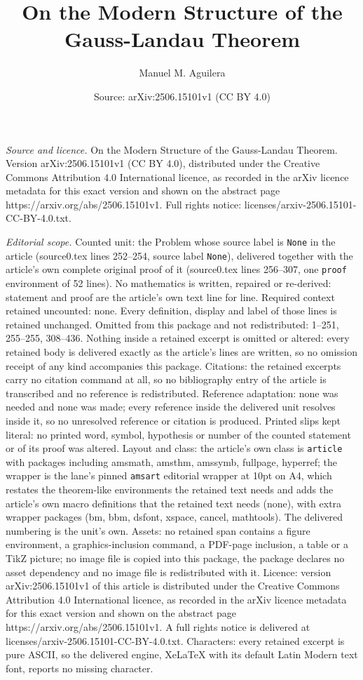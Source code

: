 \documentclass[10pt,a4paper]{amsart}
\title[On the Modern Structure of the Gauss-Landau Theorem]{On the Modern Structure of the Gauss-Landau Theorem}
\author{Manuel M. Aguilera}
\date{Source: arXiv:2506.15101v1 (CC BY 4.0)}
\begin{document}
\maketitle

\noindent\emph{Source and licence.} On the Modern Structure of the Gauss-Landau Theorem. Version arXiv:2506.15101v1 (CC BY 4.0), distributed under the Creative Commons Attribution 4.0 International licence, as recorded in the arXiv licence metadata for this exact version and shown on the abstract page https://arxiv.org/abs/2506.15101v1. Full rights notice: licenses/arxiv-2506.15101-CC-BY-4.0.txt.\par\smallskip

\noindent\textit{Editorial scope.} Counted unit: the Problem whose source label is \texttt{None} in the article (source0.tex lines 252--254, source label \texttt{None}), delivered together with the article's own complete original proof of it (source0.tex lines 256--307, one \texttt{proof} environment of 52 lines). No mathematics is written, repaired or re-derived: statement and proof are the article's own text line for line. Required context retained uncounted: none. Every definition, display and label of those lines is retained unchanged. Omitted from this package and not redistributed: 1--251, 255--255, 308--436. Nothing inside a retained excerpt is omitted or altered: every retained body is delivered exactly as the article's lines are written, so no omission receipt of any kind accompanies this package. Citations: the retained excerpts carry no citation command at all, so no bibliography entry of the article is transcribed and no reference is redistributed. Reference adaptation: none was needed and none was made; every reference inside the delivered unit resolves inside it, so no unresolved reference or citation is produced. Printed slips kept literal: no printed word, symbol, hypothesis or number of the counted statement or of its proof was altered. Layout and class: the article's own class is \texttt{article} with packages including amsmath, amsthm, amssymb, fullpage, hyperref; the wrapper is the lane's pinned \texttt{amsart} editorial wrapper at 10pt on A4, which restates the theorem-like environments the retained text needs and adds the article's own macro definitions that the retained text needs (none), with extra wrapper packages (bm, bbm, dsfont, xspace, cancel, mathtools). The delivered numbering is the unit's own. Assets: no retained span contains a figure environment, a graphics-inclusion command, a PDF-page inclusion, a table or a TikZ picture; no image file is copied into this package, the package declares no asset dependency and no image file is redistributed with it. Licence: version arXiv:2506.15101v1 of this article is distributed under the Creative Commons Attribution 4.0 International licence, as recorded in the arXiv licence metadata for this exact version and shown on the abstract page https://arxiv.org/abs/2506.15101v1. A full rights notice is delivered at licenses/arxiv-2506.15101-CC-BY-4.0.txt. Characters: every retained excerpt is pure ASCII, so the delivered engine, XeLaTeX with its default Latin Modern text font, reports no missing character.
\end{document}
